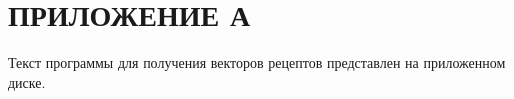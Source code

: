 \chapter*{ПРИЛОЖЕНИЕ А}
Текст программы для получения векторов рецептов представлен на приложенном диске.
